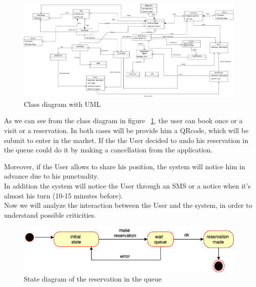 \begin{figure}[h]
  \caption{Class diagram with UML}
  \label{fig:UML}
  \centering
  \includegraphics[width=1\textwidth, height=0.6\textwidth]{diagrams/2-UML.png}

\end{figure}
\par 
\medskip
As we can see from the class diagram in figure ~\ref{fig:UML}, the user can book once or a visit or a reservation.
In both cases will be provide him a QRcode, which will be submit to enter in the market. 
If the the User decided to undo his reservation in the queue could do it by making a cancellation from the application. 
\par
\medskip
Moreover, if the User allows to share his position, the system will notice him in advance due to his punctuality.
\\
In addition the system will notice the User through an SMS or a notice when it's almost his turn (10-15 minutes before).
\\
Now we will analyze the interaction between the User and the system, in order to understand possible criticities.
\par 
\bigskip

\begin{figure}[h]
  \caption{State diagram of the reservation in the queue}
  \label{fig:Reservation}
  \centering
  \includegraphics[width=1.1\textwidth, height=0.3\textwidth]{diagrams/2-reservation.png}

\end{figure}
\par 
\medskip

